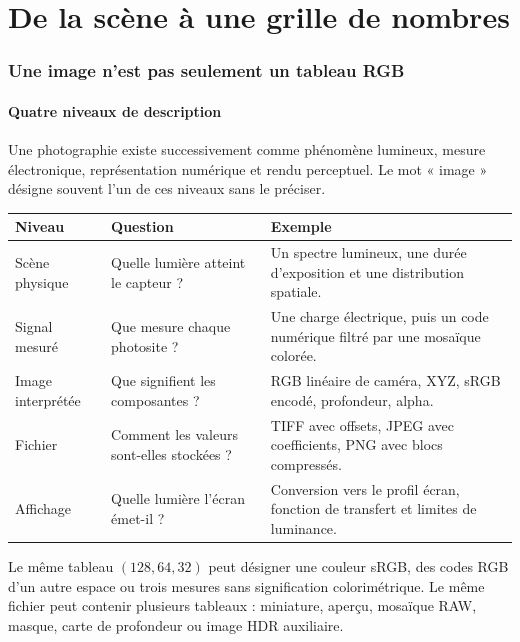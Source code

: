 \part{De la scène à une grille de nombres}

\section{Une image n'est pas seulement un tableau RGB}
\subsection{Quatre niveaux de description}
Une photographie existe successivement comme phénomène lumineux,
mesure électronique, représentation numérique et rendu perceptuel.
Le mot « image » désigne souvent l'un de ces niveaux sans le préciser.

\begin{longtable}{p{3cm}p{5.1cm}p{6.5cm}}
\toprule Niveau & Question & Exemple \\ \midrule
Scène physique & Quelle lumière atteint le capteur ? & Un spectre lumineux,
une durée d'exposition et une distribution spatiale. \\
Signal mesuré & Que mesure chaque photosite ? & Une charge électrique,
puis un code numérique filtré par une mosaïque colorée. \\
Image interprétée & Que signifient les composantes ? & RGB linéaire de
caméra, XYZ, sRGB encodé, profondeur, alpha. \\
Fichier & Comment les valeurs sont-elles stockées ? & TIFF avec offsets,
JPEG avec coefficients, PNG avec blocs compressés. \\
Affichage & Quelle lumière l'écran émet-il ? & Conversion vers le profil
écran, fonction de transfert et limites de luminance. \\ \bottomrule
\end{longtable}

Le même tableau $(128,64,32)$ peut désigner une couleur sRGB, des codes
RGB d'un autre espace ou trois mesures sans signification colorimétrique.
Le même fichier peut contenir plusieurs tableaux : miniature, aperçu,
mosaïque RAW, masque, carte de profondeur ou image HDR auxiliaire.


